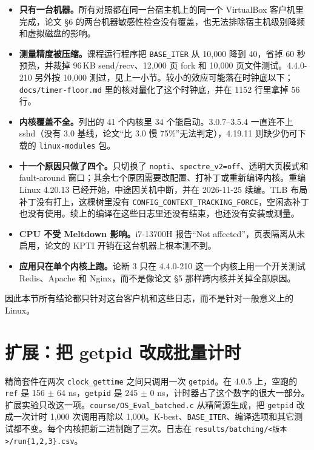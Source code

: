\documentclass[11pt,fontset=none]{ctexart}
\begin{document}
\begin{itemize}
\item \textbf{只有一台机器。}所有对照都在同一台宿主机上的同一个 VirtualBox 客户机里完成，论文 \S6 的两台机器敏感性检查没有覆盖，也无法排除宿主机级别降频和虚拟磁盘的影响。
\item \textbf{测量精度被压缩。}课程运行程序把 \texttt{BASE\_ITER} 从 10{,}000 降到 40，省掉 60 秒预热，并裁掉 96\,KB send/recv、12{,}000 页 fork 和 10{,}000 页文件测试。4.4.0-210 另外按 10{,}000 测过，见上一小节。较小的效应可能落在时钟底以下；\texttt{docs/timer-floor.md} 里的核对量化了这个时钟底，并在 1152 行里拿掉 56 行。
\item \textbf{内核覆盖不全。}列出的 41 个内核里 34 个能启动。3.0.7--3.5.4 一直连不上 sshd（没有 3.0 基线，论文“比 3.0 慢 75\%”无法判定），4.19.11 则缺少仍可下载的 \texttt{linux-modules} 包。
\item \textbf{十一个原因只做了四个。}只切换了 \texttt{nopti}、\texttt{spectre\_v2=off}、透明大页模式和 fault-around 窗口；其余七个原因需要改配置、打补丁或重新编译内核。重编 Linux 4.20.13 已经开始，中途因关机中断，并在 2026-11-25 续编。TLB 布局补丁没有打上，这棵树里没有 \texttt{CONFIG\_CONTEXT\_TRACKING\_FORCE}，空闲态补丁也没有使用。续上的编译在这些日志里还没有结束，也还没有安装或测量。
\item \textbf{CPU 不受 Meltdown 影响。}i7-13700H 报告“Not affected”，页表隔离从未启用，论文的 KPTI 开销在这台机器上根本测不到。
\item \textbf{应用只在单个内核上跑。}论断 3 只在 4.4.0-210 这一个内核上用一个开关测试 Redis、Apache 和 Nginx，而不是像论文 \S5 那样跨内核并关掉全部原因。
\end{itemize}

因此本节所有结论都只针对这台客户机和这些日志，而不是针对一般意义上的 Linux。

\section{扩展：把 getpid 改成批量计时}
\label{sec:batch}

精简套件在两次 \texttt{clock\_gettime} 之间只调用一次 \texttt{getpid}。在 4.0.5 上，空跑的 \texttt{ref} 是 156 $\pm$ 64 ns，\texttt{getpid} 是 245 $\pm$ 0 ns，计时器占了这个数字的很大一部分。扩展实验只改这一项。\texttt{course/OS\_Eval\_batched.c} 从精简源生成，把 \texttt{getpid} 改成一次计时 1{,}000 次调用再除以 1{,}000。K-best、\texttt{BASE\_ITER}、编译选项和其它测试都不变。每个内核把新二进制跑了三次。日志在 \texttt{results/batching/<版本>/run\{1,2,3\}.csv}。
\end{document}
